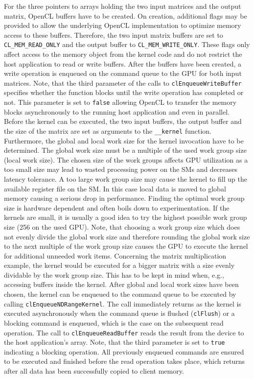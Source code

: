 For the three pointers to arrays holding the two input matrices and the output matrix, OpenCL buffers have to be created. On creation, additional flags may be provided to allow the underlying OpenCL implementation to optimize memory access to these buffers. Therefore, the two input matrix buffers are set to \lstinline!CL_MEM_READ_ONLY! and the output buffer to \lstinline!CL_MEM_WRITE_ONLY!. These flags only affect access to the memory object from the kernel code and do not restrict the host application to read or write buffers.
After the buffers have been created, a write operation is enqueued on the command queue to the GPU for both input matrices. Note, that the third parameter of the calls to \lstinline!clEnqueueWriteBuffer! specifies whether the function blocks until the write operation has completed or not. This parameter is set to \lstinline!false! allowing OpenCL to transfer the memory blocks asynchronously to the running host application and even in parallel.
Before the kernel can be executed, the two input buffers, the output buffer and the size of the matrix are set as arguments to the \lstinline!__kernel! function. Furthermore, the global and local work size for the kernel invocation have to be determined. The global work size must be a multiple of the used work group size (local work size). The chosen size of the work groups affects GPU utilization as a too small size may lead to wasted processing power on the SMs and decreases latency tolerance. A too large work group size may cause the kernel to fill up the available register file on the SM. In this case local data is moved to global memory causing a serious drop in performance. Finding the optimal work group size is hardware dependent and often boils down to experimentation. If the kernels are small, it is usually a good idea to try the highest possible work group size (256 on the used GPU).
Note, that choosing a work group size which does not evenly divide the global work size and therefore rounding the global work size to the next multiple of the work group size causes the GPU to execute the kernel for additional unneeded work items. Concerning the matrix multiplication example, the kernel would be executed for a bigger matrix with a size evenly dividable by the work group size. This has to be kept in mind when, e.g., accessing buffers inside the kernel.
After global and local work sizes have been chosen, the kernel can be enqueued to the command queue to be executed by calling \lstinline!clEnqueueNDRangeKernel!. The call immediately returns as the kernel is executed asynchronously when the command queue is flushed (\lstinline!clFlush!) or a blocking command is enqueued, which is the case on the subsequent read operation. The call to \lstinline!clEnqueueReadBuffer! reads the result from the device to the host application's array. Note, that the third parameter is set to \lstinline!true! indicating a blocking operation. All previously enqueued commands are ensured to be executed and finished before the read operation takes place, which returns after all data has been successfully copied to client memory.

